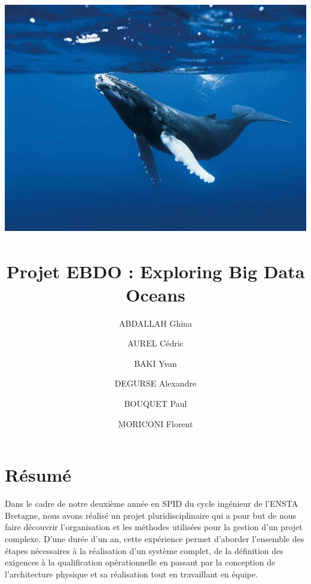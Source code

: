 \documentclass[a4paper]{article}
\begin{document}

\title{
	\includegraphics[width=\textwidth]{./tmp/IntroBaleine.png}~\\[1cm]
	\textbf{Projet EBDO} : \textbf{E}xploring \textbf{B}ig \textbf{D}ata \textbf{O}ceans}
\author{ABDALLAH Ghina\\
	\and
	AUREL Cédric\\
	\and
	BAKI Yvan\\
	\and
	DEGURSE Alexandre\\
	\and
	BOUQUET Paul\\
	\and
	MORICONI Florent}

\date{\vspace{-5ex}}
\maketitle
\newpage

\tableofcontents
\newpage

\section{Résumé}
Dans le cadre de notre deuxième année en SPID du cycle ingénieur de l’ENSTA Bretagne, nous
avons réalisé un projet pluridisciplinaire qui a pour but de nous faire découvrir l’organisation et
les méthodes utilisées pour la gestion d’un projet complexe. D’une durée d’un an, cette
expérience permet d’aborder l’ensemble des étapes nécessaires à la réalisation d’un système
complet, de la définition des exigences à la qualification opérationnelle en passant par la
conception de l’architecture physique et sa réalisation tout en travaillant en équipe.
\\
\end{document}
